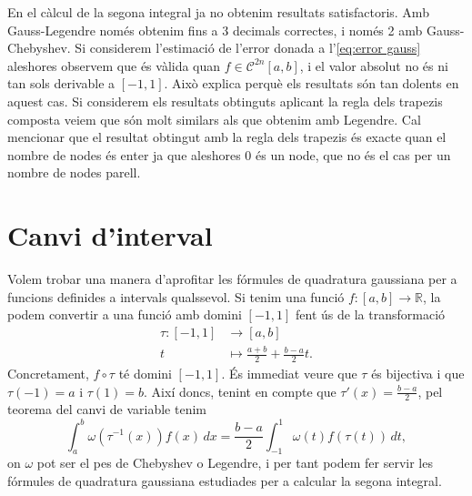 \documentclass[12pt]{article}
\numberwithin{table}{section}
\numberwithin{figure}{section}
\numberwithin{equation}{section}
\newcommand{\R}{\mathbb{R}}
\begin{document}
En el càlcul de la segona integral ja no obtenim resultats satisfactoris. Amb Gauss-Legendre només obtenim fins a 3 decimals correctes, i només 2 amb Gauss-Chebyshev. Si considerem l'estimació de l'error donada a l'\cref{eq:error gauss} aleshores observem que és vàlida quan \( f \in \mathcal{C}^{2n}[a,b] \), i el valor absolut no és ni tan sols derivable a \( [-1,1] \). Això explica perquè els resultats són tan dolents en aquest cas. Si considerem els resultats obtinguts aplicant la regla dels trapezis composta veiem que són molt similars als que obtenim amb Legendre. Cal mencionar que el resultat obtingut amb la regla dels trapezis és exacte quan el nombre de nodes és enter ja que aleshores 0 és un node, que no és el cas per un nombre de nodes parell. 

\section{Canvi d'interval}
Volem trobar una manera d'aprofitar les fórmules de quadratura gaussiana per a funcions definides a intervals qualssevol. Si tenim una funció \( f \colon [a,b] \longrightarrow \R \), la podem convertir a una funció amb domini \( [-1,1] \) fent ús de la transformació
\begin{align*}
	\tau \colon [-1,1] & \longrightarrow [a,b] \\
	t & \longmapsto \frac{a+b}{2} + \frac{b-a}{2}t.
\end{align*}
Concretament, \( f \circ \tau \) té domini \( [-1,1] \). És immediat veure que \( \tau \) és bijectiva i que \( \tau(-1) = a \) i \( \tau(1) = b \). Així doncs, tenint en compte que \( \tau'(x) = \frac{b-a}{2} \), pel teorema del canvi de variable tenim
\begin{equation*}
	\int_a^b \omega(\tau^{-1}(x)) f(x) \,dx = \frac{b-a}{2}\int_{-1}^1 \omega(t) f(\tau(t)) \,dt,
\end{equation*}
on \( \omega \) pot ser el pes de Chebyshev o Legendre, i per tant podem fer servir les fórmules de quadratura gaussiana estudiades per a calcular la segona integral. 
\end{document}
